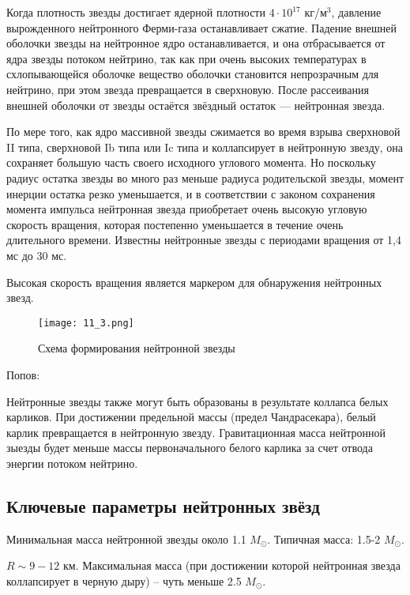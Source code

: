 Когда плотность звезды достигает ядерной плотности $4\cdot10^{17}$ кг/м$^3$, давление вырожденного нейтронного Ферми-газа останавливает сжатие. Падение внешней оболочки звезды на нейтронное ядро останавливается, и она отбрасывается от ядра звезды потоком нейтрино, так как при очень высоких температурах в схлопывающейся оболочке вещество оболочки становится непрозрачным для нейтрино, при этом звезда превращается в сверхновую. После рассеивания внешней оболочки от звезды остаётся звёздный остаток — нейтронная звезда.

По мере того, как ядро массивной звезды сжимается во время взрыва сверхновой II типа, сверхновой Ib типа или Ic типа и коллапсирует в нейтронную звезду, она сохраняет большую часть своего исходного углового момента. Но поскольку радиус остатка звезды во много раз меньше радиуса родительской звезды, момент инерции остатка резко уменьшается, и в соответствии с законом сохранения момента импульса нейтронная звезда приобретает очень высокую угловую скорость вращения, которая постепенно уменьшается в течение очень длительного времени. Известны нейтронные звезды с периодами вращения от 1,4 мс до 30 мс.

Высокая скорость вращения является маркером для обнаружения нейтронных звезд.


\begin{figure}[H]
\centering
\texttt{[image: 11\_3.png]}
\caption{Схема формирования нейтронной звезды}
\label{ЛЕЙБЛ ДЛЯ ССЫЛКИ НА КАРТИНКУ}
\end{figure}




Попов:

Нейтронные звезды также могут быть образованы в результате коллапса белых карликов. При достижении предельной массы (предел Чандрасекара), белый карлик превращается в нейтронную звезду. Гравитационная масса нейтронной зыезды будет меньше массы первоначального белого карлика за счет отвода энергии потоком нейтрино. 




\subsection{Ключевые параметры нейтронных звёзд}

Минимальная масса нейтронной звезды около 1.1 $M_\odot$. Типичная масса: 1.5-2 $M_\odot$. 

$R \sim 9-12$ км. Максимальная масса (при достижении которой нейтронная звезда коллапсирует в черную дыру) -- чуть меньше 2.5 $M_\odot$.

